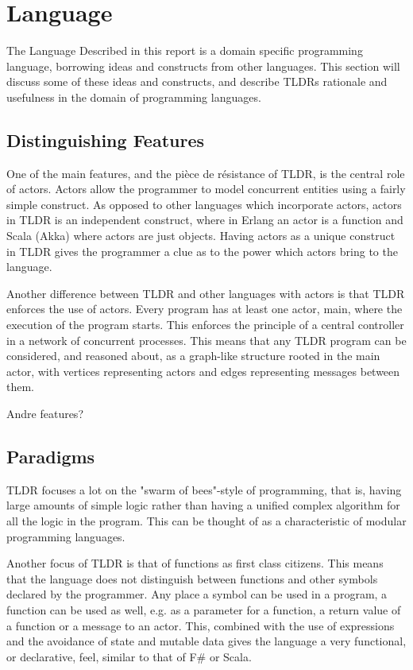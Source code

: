 \section{Language}
The Language Described in this report is a domain specific programming language, borrowing ideas and constructs from other languages. This section will discuss some of these ideas and constructs, and describe TLDRs rationale and usefulness in the domain of programming languages.

\subsection{Distinguishing Features}
One of the main features, and the pièce de résistance of TLDR, is the central role of actors. Actors allow the programmer to model concurrent entities using a fairly simple construct. As opposed to other languages which incorporate actors, actors in TLDR is an independent construct, where in Erlang an actor is a function and Scala (Akka) where actors are just objects. Having actors as a unique construct in TLDR gives the programmer a clue as to the power which actors bring to the language. 

Another difference between TLDR and other languages with actors is that TLDR enforces the use of actors. Every program has at least one actor, main, where the execution of the program starts. This enforces the principle of a central controller in a network of concurrent processes. This means that any TLDR program can be considered, and reasoned about, as a graph-like structure rooted in the main actor, with vertices representing actors and edges representing messages between them.

Andre features?

\subsection{Paradigms}
TLDR focuses a lot on the "swarm of bees"-style of programming, that is, having large amounts of simple logic rather than having a unified complex algorithm for all the logic in the program. This can be thought of as a characteristic of modular programming languages.

Another focus of TLDR is that of functions as first class citizens. This means that the language does not distinguish between functions and other symbols declared by the programmer. Any place a symbol can be used in a program, a function can be used as well, e.g. as a parameter for a function, a return value of a function or a message to an actor. This, combined with the use of expressions and the avoidance of state and mutable data gives the language a very functional, or declarative, feel, similar to that of F\# or Scala.

